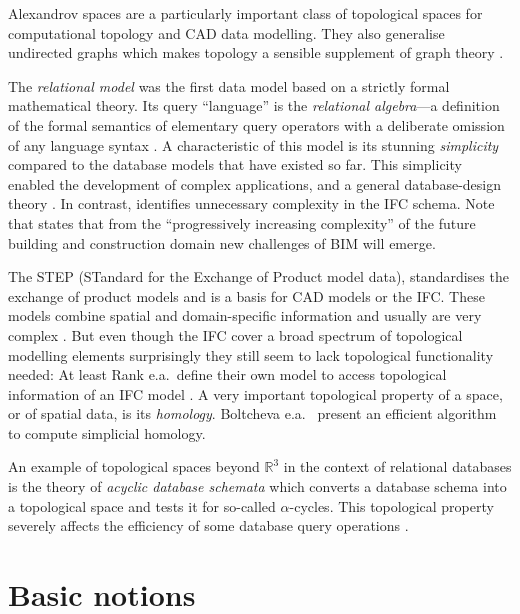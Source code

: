 \documentclass[5p]{elsarticle}
\newcommand{\qq}[1]{``#1''}
\begin{document}
Alexandrov spaces \cite{Alexandroff} are a particularly important class of 
topological spaces for computational topology \cite{Arenas:AlexandroffSpaces} 
and CAD data modelling. 
They also generalise undirected graphs which makes topology a sensible supplement of graph 
theory \cite{Vella:GraphTheoryIsTopology}. 

The \emph{relational model} \cite{Codd:RelationalModel} was the first data model based on 
a strictly formal mathematical theory. Its query \qq{language} is the 
\emph{relational algebra}---a definition of the formal semantics of elementary 
query operators with a deliberate omission of any language syntax 
\cite[p.\ 21]{Codd:RelationalModel}. A characteristic of this model is its 
stunning \emph{simplicity} compared to the database models that have existed so far. 
This simplicity enabled the development of complex applications, and 
a general database-design theory \cite{Codd:DataModels}. 
In contrast, \cite{Amor:BIM2007} identifies unnecessary complexity in the IFC schema.  
Note that \cite{Watson:Challenges} states that from the \qq{progressively increasing complexity} 
of the future building and construction domain new challenges of BIM will emerge. 



The STEP (STandard for the Exchange of Product model data), standardises the exchange of 
product models \cite{Aug95, Eas99} and is a basis for CAD models or the IFC\@. 
These models combine spatial and domain-specific information and usually are very complex 
\cite{Amor:BIM2007, Eas99}. But even though the IFC cover a broad spectrum of 
topological modelling elements \cite{Paul-2010} surprisingly they still seem to lack topological 
functionality needed: At least Rank e.a.\ define their own model to 
access topological information of an IFC model \cite{SPP1103:RankEtAl}. 
A very important topological property of a space, or of spatial data, is its 
\emph{homology}. Boltcheva e.a.\ \cite{Boltcheva:Homology} present an efficient algorithm to 
compute simplicial homology. 

An example of topological spaces beyond $\mathbb{R}^3$ in the context of relational databases 
is the theory of \emph{acyclic database schemata} which converts a database schema into a 
topological space and tests it for so-called $\alpha$-cycles. 
This topological property severely affects the efficiency of some database query 
operations \cite{Fagin:acyclicdatabase}. 


\section{Basic notions}\label{sec:basics}
\end{document}

